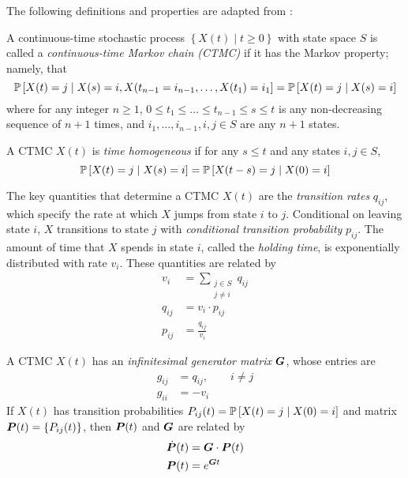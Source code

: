 The following definitions and properties are adapted from \citet{STAT455}:
\begin{defn}
A continuous-time stochastic process $\left\lbrace X(t) \; | \; t \geq 0 \right\rbrace$ with state space $S$ is called a \emph{continuous-time Markov chain (CTMC)} if it has the Markov property; namely, that 
\begin{equation}
\P \left[ X(t) = j \; | \; X(s) = i, X(t_{n-1} = i_{n-1}, \dots , X(t_1) = i_1 \right] = \P \left[ X(t) = j \; | \; X(s) = i \right]
\end{equation}
where for any integer $n \geq 1$, $0 \leq t_1 \leq \dots \leq t_{n-1} \leq s \leq t$ is any non-decreasing sequence of $n+1$ times, and $i_1,\dots,i_{n-1}, i, j \in S$ are any $n+1$ states.
\end{defn}
\begin{defn} A CTMC $X(t)$ is \emph{time homogeneous} if for any $s \leq t$ and any states $i,j \in S$,
\begin{equation}
\P \left[ X(t) = j \; | \; X(s) = i \right] = \P \left[ X(t-s) = j \; | \; X(0) = i \right]
\end{equation}
\end{defn}
\begin{defn}
The key quantities that determine a CTMC $X(t)$ are the \emph{transition rates} $q_{ij}$, which specify the rate at which $X$ jumps from state $i$ to $j$. Conditional on leaving state $i$, $X$ transitions to state $j$ with \emph{conditional transition probability} $p_{ij}$. The amount of time that $X$ spends in state $i$, called the \emph{holding time}, is exponentially distributed with rate $v_i$. These quantities are related by
\begin{align}
v_i & = \sum_{\substack{j \in S \\ j \neq i}} q_{ij} \\
q_{ij} & = v_i \cdot p_{ij} \\
p_{ij} & = \frac{q_{ij}}{v_i}
\end{align} 
\end{defn}
\begin{defn}
A CTMC $X(t)$ has an \emph{infinitesimal generator matrix} $\mat{G}$, whose entries are
\begin{align}
g_{ij} &= q_{ij}, \qquad i \neq j \\
g_{ii} & = -v_i
\end{align}
If $X(t)$ has transition probabilities $P_{ij}(t) = \P \left[ X(t) = j \; | \; X(0) = i \right]$ and matrix $\mat{P}(t) = \lbrace P_{ij}(t) \rbrace$, then $\mat{P}(t)$ and $\mat{G}$ are related by
\begin{align}
\dot{\mat{P}}(t) & = \mat{G} \cdot \mat{P}(t) \\
\mat{P}(t)  &= e^{\mat{G}t} \label{eq:CTMCPG}
\end{align}
\end{defn}

